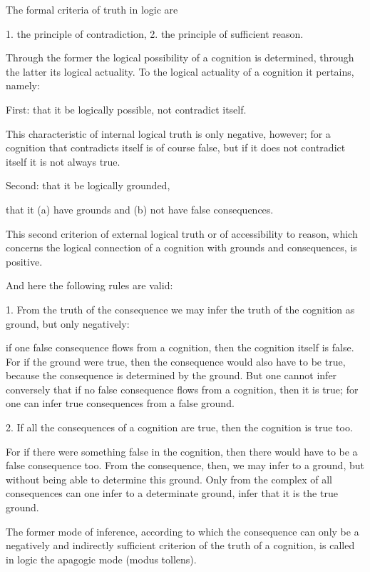     The formal criteria of truth in logic are

    1. the principle of contradiction,
    2. the principle of sufficient reason.

    Through the former the logical possibility of a cognition is determined,
    through the latter its logical actuality.
    To the logical actuality of a cognition it pertains, namely:

    First: that it be logically possible, not contradict itself.

        This characteristic of internal logical truth is only negative, however;
        for a cognition that contradicts itself is of course false,
        but if it does not contradict itself it is not always true.

    Second: that it be logically grounded,

    that it (a) have grounds and (b) not have false consequences.

        This second criterion of external logical truth or
        of accessibility to reason, which concerns the logical connection of
        a cognition with grounds and consequences, is positive.

    And here the following rules are valid:

    1. From the truth of the consequence we may infer
    the truth of the cognition as ground, but only negatively:

        if one false consequence flows from a cognition,
        then the cognition itself is false.
        For if the ground were true,
        then the consequence would also have to be true,
        because the consequence is determined by the ground.
        But one cannot infer conversely that
        if no false consequence flows from a cognition, then it is true;
        for one can infer true consequences from a false ground.

    2. If all the consequences of a cognition are true,
    then the cognition is true too.

        For if there were something false in the cognition,
        then there would have to be a false consequence too.
        From the consequence, then, we may infer to a ground,
        but without being able to determine this ground.
        Only from the complex of all consequences can one
        infer to a determinate ground,
        infer that it is the true ground.

    The former mode of inference, according to which the consequence
    can only be a negatively and indirectly sufficient criterion of the truth of a
    cognition, is called in logic the apagogic mode (modus tollens).

